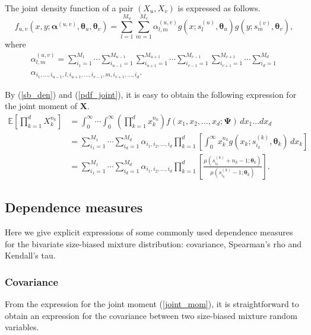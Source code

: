 \documentclass[eng]{csam}
\def\a{\alpha}
\def\mE{\mathbb{E}}
\begin{document}
The joint density function of a pair $(X_u, X_v)$ is expressed as follows.
\begin{equation}\label{pair_density}
f_{u,v}(x, y; \bm{\a}^{(u,v)}, \bm{\theta}_u, \bm{\theta}_v) = \sum_{l = 1}^{M_u}\sum_{m = 1}^{M_v} \a^{(u,v)}_{l,m} g(x;s^{(u)}_{l},\bm{\theta}_u)g(y;s^{(v)}_{m},\bm{\theta}_v),
\end{equation}
where
\begin{multline*}
\a^{(u,v)}_{l,m} = \sum_{i_1 = 1}^{M_1} \cdots \sum_{i_{u-1} = 1}^{M_{u-1}}\sum_{i_{u+1} = 1}^{M_{u+1}}\cdots \sum_{i_{v-1} = 1}^{M_{v-1}}\sum_{i_{v+1} = 1}^{M_{v+1}}\cdots \sum_{i_d = 1}^{M_d}\\
\a_{i_1,\ldots,i_{u-1}, l, i_{u+1},\ldots, i_{v-1}, m, i_{v+1},\ldots, i_d}.
\end{multline*}

By (\ref{sb_den}) and (\ref{pdf_joint}), it is easy to obtain the following expression for the joint moment of $\bm{X}$.
\begin{align}
\mE\left[\prod_{k=1}^d X_{k}^{n_k}\right] &= \int_0^{\infty} \cdots \int_0^{\infty}\left(\prod_{k=1}^d x_{k}^{n_k}\right) f(x_1,x_2,\ldots,x_d; \bm{\Psi})\, dx_1\ldots dx_d \nonumber\\
&= \sum_{i_1 = 1}^{M_1} \cdots\sum_{i_d = 1}^{M_d} \a_{i_1,i_2,\ldots,i_d} \prod_{k=1}^d \left[\int_0^{\infty} x_k^{n_k}g(x_k;s^{(k)}_{i_k}, \bm{\theta}_k)\, dx_k\right] \nonumber\\
&= \sum_{i_1 = 1}^{M_1} \cdots\sum_{i_d = 1}^{M_d} \a_{i_1,i_2,\ldots,i_d} \prod_{k=1}^d \left[\frac{\mu(s^{(k)}_{i_k} + n_k -1; \bm{\theta}_k)}{\mu(s^{(k)}_{i_k} -1; \bm{\theta}_k)}\right]. \label{joint_mom}
\end{align}


\subsection{Dependence measures}
Here we give explicit expressions of some commonly used dependence measures for the bivariate size-biased mixture distribution: covariance, Spearman's rho and Kendall's tau.

\subsubsection{Covariance}

From the expression for the joint moment (\ref{joint_mom}), it is straightforward to obtain an expression for the covariance between two size-biased mixture random variables.
\end{document}

